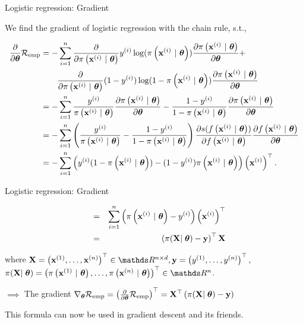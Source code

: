 \documentclass[11pt,compress,t,notes=noshow, xcolor=table]{beamer}
\begin{document}
\begin{vbframe}{Logistic regression: Gradient}

We find the gradient of logistic regression with the chain rule, s.t., 

\vspace*{-0.5cm}

{\small
\begin{align*}
  \frac{\partial}{\partial\thetav}\riske  & =  
 -\sumin \frac{\partial}{\partial\pixit }\yi\log(\pixit)\frac{\partial\pixit}{\partial \thetav} +  \\
 & \qquad \frac{\partial}{\partial\pixit} (1-\yi)\log(1-\pixit)\frac{\partial\pixit}{\partial \thetav}\\
 & =  
 -\sumin \frac{\yi}{\pixit}\frac{\partial\pixit}{\partial \thetav} -  \frac{1-\yi}{1-\pixit}\frac{\partial\pixit}{\partial \thetav}\\
 &=  
  -\sumin \left(\frac{\yi}{\pixit} -  \frac{1-\yi}{1-\pixit}\right)\frac{\partial s(\fxit)}{\partial  \fxit}\frac{\partial  \fxit}{\partial\thetav}\\
  &=  
  -\sum^n_{i=1} \left(\yi(1-\pixit)  -  (1-\yi)\pixit \right)\left(\xi\right)^\top.\\
\end{align*}
}


\end{vbframe}
\begin{vbframe}{Logistic regression: Gradient}

\begin{align*}
  \quad &=& 
  \sumin \left(\pixit - \yi\right)\left(\xi\right)^\top\\
    \quad &=& 
  \left(\pi(\mathbf{X}\vert\;\thetav) - \mathbf{y}\right)^\top\mathbf{X}\\
\end{align*}

where  $\mathbf{X} = \left(
    \xi[1], \dots, 
    \xi[n]\right)^\top \in \R^{n\times d}, \mathbf{y} = \left(
    \yi[1], \dots,
    \yi[n]
\right)^\top,$ \\ $\pi(\mathbf{X}\vert\;\thetav) = \left(
    \pixit[1], \dots,
    \pixit[n]
\right)^\top \in \R^{n}$.

\vspace*{1cm}

$\implies$ The gradient $\nabla_{\thetav}\riske = \left(\frac{\partial}{\partial\thetav}\riske\right)^\top =  \mathbf{X}^\top\left(\pi(\mathbf{X}\vert\;\thetav) - \mathbf{y}\right)$ 

\vspace*{1cm}

This formula can now be used in gradient descent and its friends.

\end{vbframe}
\end{document}
